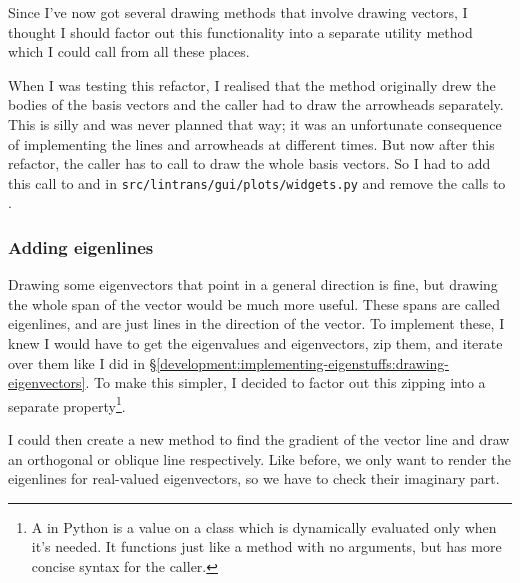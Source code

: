\documentclass[../development.tex]{subfiles}
\begin{document}
Since I've now got several drawing methods that involve drawing vectors, I thought I should factor out this functionality into a separate utility method which I could call from all these places.


When I was testing this refactor, I realised that the  method originally drew the bodies of the basis vectors and the caller had to draw the arrowheads separately. This is silly and was never planned that way; it was an unfortunate consequence of implementing the lines and arrowheads at different times. But now after this refactor, the caller has to call  to draw the whole basis vectors. So I had to add this call to  and  in \texttt{src/lintrans/gui/plots/widgets.py} and remove the calls to .

\subsubsection{Adding eigenlines\label{development:implementing-eigenstuffs:adding-eigenlines}}

Drawing some eigenvectors that point in a general direction is fine, but drawing the whole span of the vector would be much more useful. These spans are called eigenlines, and are just lines in the direction of the vector. To implement these, I knew I would have to get the eigenvalues and eigenvectors, zip them, and iterate over them like I did in \S\ref{development:implementing-eigenstuffs:drawing-eigenvectors}. To make this simpler, I decided to factor out this zipping into a separate  property\footnote{A  in Python is a value on a class which is dynamically evaluated only when it's needed. It functions just like a method with no arguments, but has more concise syntax for the caller.}.


I could then create a new method to find the gradient of the vector line and draw an orthogonal or oblique line respectively. Like before, we only want to render the eigenlines for real-valued eigenvectors, so we have to check their imaginary part.
\end{document}
